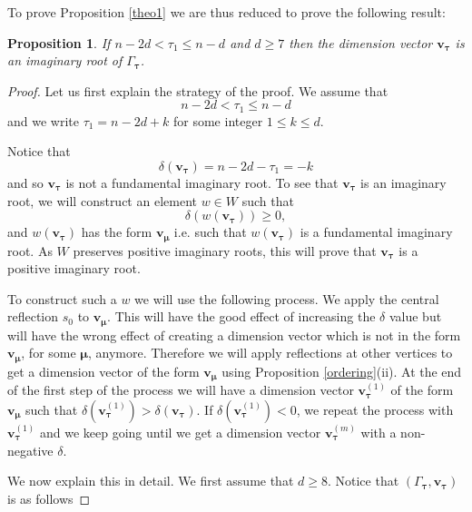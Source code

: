 \documentclass[11pt]{article}
\newtheorem{prop}[theo]{Proposition}
\theoremstyle{definition}
\numberwithin{equation}{section}
\newcommand{\bv}{{\mathbf{v}}}
\newcommand{\muhat}{{\boldsymbol \mu}}
\newcommand{\tauhat}{{\boldsymbol \tau}}
\begin{document}
To prove Proposition \ref{theo1} we are thus reduced to prove the following result:

\begin{prop}If $n-2d<\tau_1\leq n-d$  and $d\geq 7$ then the dimension vector $\bv_\tauhat$ is an imaginary root of $\Gamma_\tauhat$.
	\label{theo1'}\end{prop}


\begin{proof}Let us first explain the strategy of the proof. We assume that
	$$
	n-2d< \tau_1\leq n-d
	$$
	and we write $\tau_1=n-2d+k$ for some integer $1\leq k\leq d$. 

	Notice that 
	$$
	\delta(\bv_\tauhat)=n-2d-\tau_1=-k
	$$
	and so $\bv_\tauhat$ is not a fundamental imaginary root. To see that $\bv_\tauhat$ is an imaginary root, we will construct an element $w\in W$ such that 
	$$
	\delta(w(\bv_\tauhat))\geq 0,
	$$
	and $w(\bv_\tauhat)$ has the form $\bv_\muhat$ i.e. such that $w(\bv_\tauhat)$ is a fundamental imaginary root. As $W$ preserves positive imaginary roots, this will prove that $\bv_\tauhat$ is a positive  imaginary root.
	
	To construct such a $w$ we will use the following process. We apply the central reflection $s_0$ to $\bv_\muhat$. This will have the good effect of increasing the $\delta$ value but will have the wrong effect of creating a dimension vector which is not in the form $\bv_\muhat$, for some $\muhat$, anymore. Therefore we will apply reflections at other vertices to get a dimension vector of the form $\bv_\muhat$ using Proposition \ref{ordering}(ii). At the end of the first step of the process we will have a dimension vector $\bv_\tauhat^{(1)}$ of the form $\bv_\muhat$ such that $\delta(\bv_\tauhat^{(1)})>\delta(\bv_\tauhat)$. If $\delta(\bv_\tauhat^{(1)})<0$, we repeat the process with $\bv_\tauhat^{(1)}$ and we keep going  until we get a dimension vector $\bv_\tauhat^{(m)}$ with a non-negative $\delta$.
	
	We now explain this in detail. We first assume that $d\geq 8$. Notice that $(\Gamma_\tauhat,\bv_\tauhat)$ is as follows
	

\end{proof}
\end{document}
